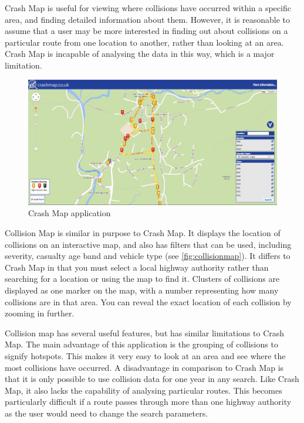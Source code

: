 \documentclass[authoryearcitations]{UoYCSproject}
\begin{document}
Crash Map is useful for viewing where collisions have occurred within a specific area, and finding detailed information about them. However, it is reasonable to assume that a user may be more interested in finding out about collisions on a particular route from one location to another, rather than looking at an area. Crash Map is incapable of analysing the data in this way, which is a major limitation.

\begin{figure}
	\center
	\includegraphics[scale=0.25]{crashmap}
	\caption{Crash Map application}
	\label{fig:crashmap}
\end{figure}

Collision Map \citep{DepartmentforTransport} is similar in purpose to Crash Map. It displays the location of collisions on an interactive map, and also has filters that can be used, including severity, casualty age band and vehicle type (see \autoref{fig:collisionmap}). It differs to Crash Map in that you must select a local highway authority rather than searching for a location or using the map to find it. Clusters of collisions are displayed as one marker on the map, with a number representing how many collisions are in that area. You can reveal the exact location of each collision by zooming in further.

Collision map has several useful features, but has similar limitations to Crash Map. The main advantage of this application is the grouping of collisions to signify hotspots. This makes it very easy to look at an area and see where the most collisions have occurred. A disadvantage in comparison to Crash Map is that it is only possible to use collision data for one year in any search. Like Crash Map, it also lacks the capability of analysing particular routes. This becomes particularly difficult if a route passes through more than one highway authority as the user would need to change the search parameters. 
\end{document}
